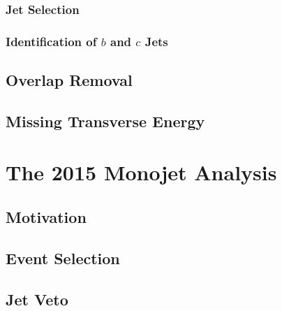\documentclass[10pt,twoside,cucitura,classica,english,openany]{toptesi}
\begin{document}


\subsection{Jet Selection}
\label{sec:jet-selection}



\subsection{Identification of $b$ and $c$ Jets}
\label{sec:b-jets}



\section{Overlap Removal}
\label{sec:overlap-removal}



\section{Missing Transverse Energy}
\label{sec:miss-transv-energy}



\chapter{The 2015 Monojet Analysis}
\label{cha:monojet-signature}

\section{Motivation}
\label{sec:motivation}



\section{Event Selection}
\label{sec:event-selection}



\section{Jet Veto }
\label{sec:jet-veto}


\end{document}
